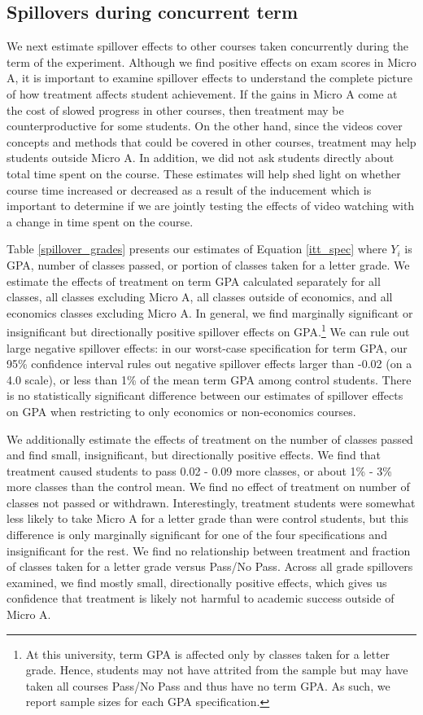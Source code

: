 \documentclass[12pt]{article}
\begin{document}
\subsection{Spillovers during concurrent term}

We next estimate spillover effects to other courses taken concurrently during the term of the experiment. Although we find positive effects on exam scores in Micro A, it is important to examine spillover effects to understand the complete picture of how treatment affects student achievement. If the gains in Micro A come at the cost of slowed progress in other courses, then treatment may be counterproductive for some students. On the other hand, since the videos cover concepts and methods that could be covered in other courses, treatment may help students outside Micro A.  In addition, we did not ask students directly about total time spent on the course.  These estimates will help shed light on whether course time increased or decreased as a result of the inducement which is important to determine if we are jointly testing the effects of video watching with a change in time spent on the course.  

Table \ref{spillover_grades} presents our estimates of Equation \ref{itt_spec} where $Y_i$ is GPA, number of classes passed, or portion of classes taken for a letter grade. We estimate the effects of treatment on term GPA calculated separately for all classes, all classes excluding Micro A, all classes outside of economics, and all economics classes excluding Micro A. In general, we find marginally significant or insignificant but directionally positive spillover effects on GPA.\footnote{At this university, term GPA is affected only by classes taken for a letter grade. Hence, students may not have attrited from the sample but may have taken all courses Pass/No Pass and thus have no term GPA. As such, we report sample sizes for each GPA specification.} We can rule out large negative spillover effects: in our worst-case specification for term GPA, our 95\% confidence interval rules out negative spillover effects larger than -0.02 (on a 4.0 scale), or less than 1\% of the mean term GPA among control students. There is no statistically significant difference between our estimates of spillover effects on GPA when restricting to only economics or non-economics courses.

We additionally estimate the effects of treatment on the number of classes passed and find small, insignificant, but directionally positive effects. We find that treatment caused students to pass 0.02 - 0.09 more classes, or about 1\% - 3\% more classes than the control mean. We find no effect of treatment on number of classes not passed or withdrawn. Interestingly, treatment students were somewhat less likely to take Micro A for a letter grade than were control students, but this difference is only marginally significant for one of the four specifications and insignificant for the rest. We find no relationship between treatment and fraction of classes taken for a letter grade versus Pass/No Pass. Across all grade spillovers examined, we find mostly small, directionally positive effects, which gives us confidence that treatment is likely not harmful to academic success outside of Micro A.
\end{document}
